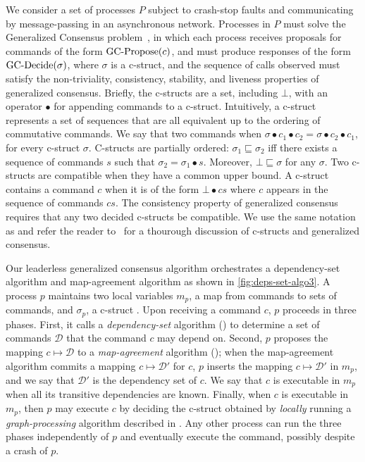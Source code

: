 We consider a set of processes $P$ subject to crash-stop faults and communicating by message-passing in an asynchronous network. Processes in $P$ must solve the Generalized Consensus problem~\cite{Lamport05GeneralizeConsensus}, in which each process receives proposals for commands of the form $\operatorname{GC-Propose}(c)$, and must produce responses of the form $\operatorname{GC-Decide}(\sigma)$, where $\sigma$ is a c-struct, and the sequence of calls observed must satisfy the non-triviality, consistency, stability, and liveness properties of generalized consensus.
Briefly, the c-structs are a set, including $\bot$, with an operator $\bullet$ for appending commands to a c-struct. Intuitively, a c-struct represents a set of sequences that are all equivalent up to the ordering of commutative commands.
We say that two commands when $\sigma\bullet c_1\bullet c_2 =  \sigma\bullet c_2\bullet c_1 $, for every c-struct $\sigma$.
C-structs are partially ordered: $\sigma_1\sqsubseteq \sigma_2$ iff there exists a sequence of commands $s$ such that $\sigma_2 = \sigma_1\bullet s$. Moreover, $\bot\sqsubseteq \sigma$ for any
$\sigma$. Two c-structs are compatible when they have a
common upper bound. A c-struct contains a command $c$ when it is of the form $\bot\bullet cs$ where $c$ appears in the sequence of commands $cs$. The consistency property of generalized consensus requires that any two decided c-structs be compatible.
We use the same notation as and refer the reader to~\cite{Lamport05GeneralizeConsensus} for a thourough discussion of c-structs and generalized consensus. 

Our leaderless generalized consensus algorithm orchestrates a dependency-set algorithm and map-agreement algorithm as shown in \cref{fig:deps-set-algo3}.
A process $p$ maintains two local variables $m_p$, a map from commands to sets of commands, and $\sigma_p$, a c-struct . Upon  receiving a command $c$, $p$ proceeds in three phases. First, it calls a \textit{dependency-set} algorithm () to determine a set of commands $\mathcal{D}$ that the command $c$ may depend on. Second, $p$ proposes the mapping  $c\mapsto \mathcal{D}$ to a \textit{map-agreement} algorithm (); when the map-agreement algorithm
commits a mapping $c\mapsto \mathcal{D}'$ for $c$, $p$ inserts the mapping $c \mapsto \mathcal{D}'$ in $m_p$, and we say that $\mathcal{D}'$ is the dependency set of $c$.
We say that $c$ is executable in $m_p$ when all its transitive dependencies are known. %
Finally, when $c$ is executable in $m_p$, then $p$ may execute $c$ by deciding the c-struct obtained by \emph{locally} running a \emph{graph-processing} algorithm described in .
Any other process can run the three phases independently of $p$ and eventually execute the command, possibly despite a crash of $p$.

